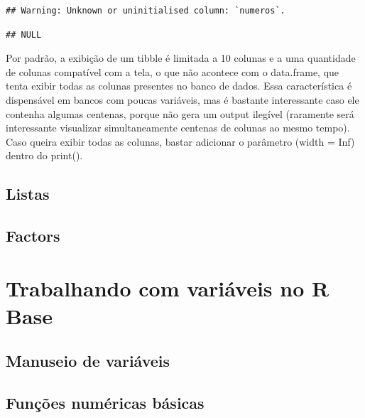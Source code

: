 \documentclass[
]{book}
\newenvironment{Shaded}{\begin{snugshade}}{\end{snugshade}}
\newcommand{\NormalTok}[1]{#1}
\newcommand{\SpecialCharTok}[1]{\textcolor[rgb]{0.00,0.00,0.00}{#1}}
\begin{document}
\begin{Shaded}
\end{Shaded}

\begin{verbatim}
## Warning: Unknown or uninitialised column: `numeros`.
\end{verbatim}

\begin{verbatim}
## NULL
\end{verbatim}

Por padrão, a exibição de um tibble é limitada a 10 colunas e a uma quantidade de colunas compatível com a tela, o que não acontece com o data.frame, que tenta exibir todas as colunas presentes no banco de dados. Essa característica é dispensável em bancos com poucas variáveis, mas é bastante interessante caso ele contenha algumas centenas, porque não gera um output ilegível (raramente será interessante visualizar simultaneamente centenas de colunas ao mesmo tempo). Caso queira exibir todas as colunas, bastar adicionar o parâmetro (width = Inf) dentro do print().

\hypertarget{listas}{%
\section{Listas}\label{listas}}

\hypertarget{factors}{%
\section{Factors}\label{factors}}

\hypertarget{trabalhando-com-variuxe1veis-no-r-base}{%
\chapter{Trabalhando com variáveis no R Base}\label{trabalhando-com-variuxe1veis-no-r-base}}

\hypertarget{manuseio-de-variuxe1veis}{%
\section{Manuseio de variáveis}\label{manuseio-de-variuxe1veis}}

\hypertarget{funuxe7uxf5es-numuxe9ricas-buxe1sicas}{%
\section{Funções numéricas básicas}\label{funuxe7uxf5es-numuxe9ricas-buxe1sicas}}
\end{document}
